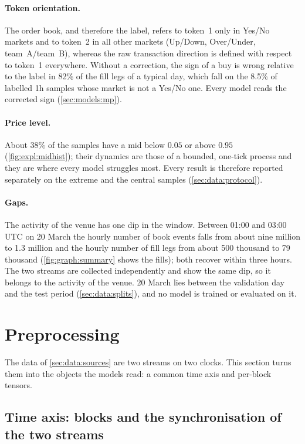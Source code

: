 \paragraph{Token orientation.}  The order book, and therefore the label, refers to
token~1 only in Yes/No markets and to token~2 in all other markets (Up/Down, Over/Under,
team~A/team~B), whereas the raw transaction direction is defined with respect to token~1
everywhere.  Without a correction, the sign of a buy is wrong relative to the label in 82\%
of the fill legs of a typical day, which fall on the 8.5\% of labelled 1h samples whose
market is not a Yes/No one.  Every model reads the
corrected sign (\cref{sec:models:mp}).

\paragraph{Price level.}  About 38\% of the samples have a mid below $0.05$ or above
$0.95$ (\cref{fig:expl:midhist}); their dynamics are those of a bounded, one-tick process
and they are where every model struggles most.  Every result is therefore reported
separately on the extreme and the central samples (\cref{sec:data:protocol}).

\paragraph{Gaps.}  The activity of the venue has one dip in the window.  Between 01:00
and 03:00 UTC on 20 March the hourly number of book events falls from about nine million
to 1.3 million and the hourly number of fill legs from about 500 thousand to 79 thousand
(\cref{fig:graph:summary} shows the fills); both recover within three hours.  The two streams are
collected independently and show the same dip, so it belongs to the activity of the
venue.  20 March lies between the validation day and the test period
(\cref{sec:data:splits}), and no model is trained or evaluated on it.

\section{Preprocessing}
\label{ch:prep}

The data of \cref{sec:data:sources} are two streams on two clocks.  This section turns
them into the objects the models read: a common time axis and per-block tensors.

\subsection{Time axis: blocks and the synchronisation of the two streams}
\label{sec:data:blocks}

